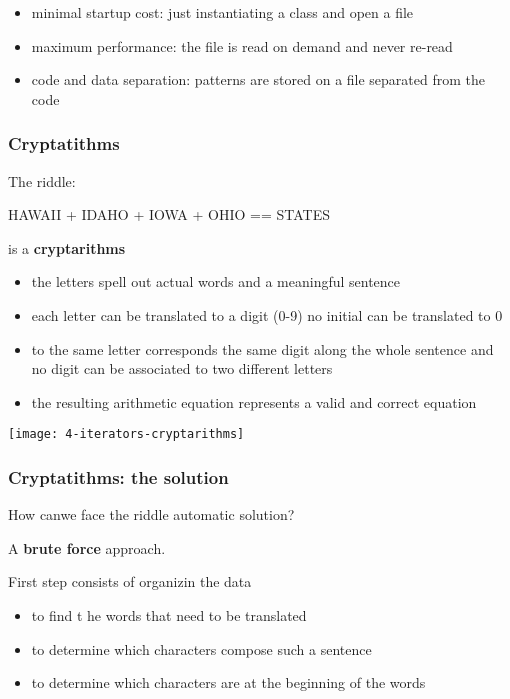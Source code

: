 \begin{itemize}
	\item minimal startup cost: just instantiating a class and open a file
	\item maximum performance: the file is read on demand and never re-read
	\item code and data separation: patterns are stored on a file separated from the code 
\end{itemize}

\subsubsection{Cryptatithms}
The riddle:

\begin{center}
HAWAII + IDAHO + IOWA + OHIO == STATES
\end{center}

is a \textbf{cryptarithms}

\begin{itemize}
	\item the letters spell out actual words and a meaningful sentence
	\item each letter can be translated to a digit (0-9) no initial can be translated to 0
	\item to the same letter corresponds the same digit along the whole
sentence and no digit can be associated to two different letters
	\item the resulting arithmetic equation represents a valid and correct equation
\end{itemize}

\begin{center}
\texttt{[image: 4-iterators-cryptarithms]}
\end{center}

\subsubsection{Cryptatithms: the solution}

How canwe face the riddle automatic solution?

A \textbf{brute force} approach.

First step consists of organizin the data
\begin{itemize}
	\item to find t he words that need to be translated
	\item to determine which characters compose such a sentence 
	\item to determine which characters are at the beginning of the words
\end{itemize}

